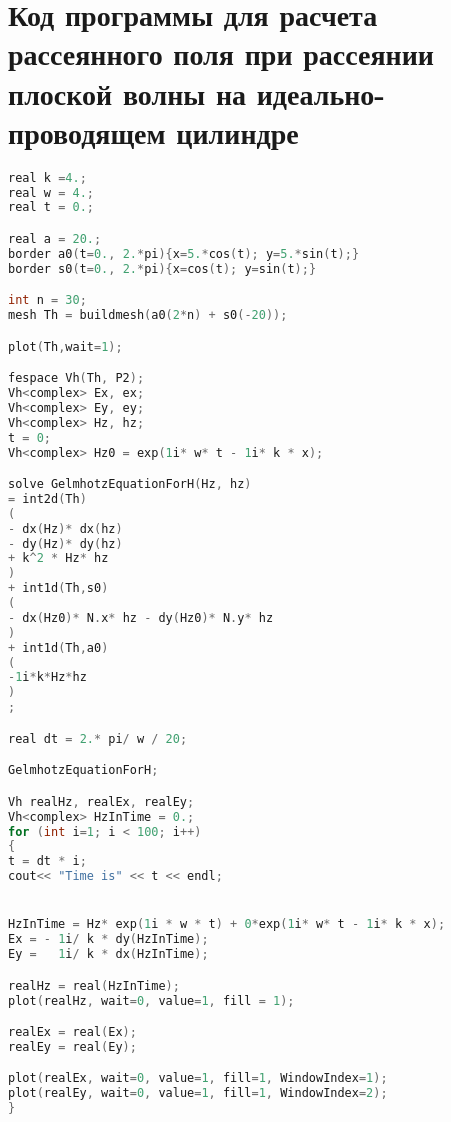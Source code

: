 
\chapter{Код программы для расчета рассеянного поля при рассеянии плоской волны на идеально-проводящем цилиндре}


\begin{lstlisting}[language=C]
real k =4.;
real w = 4.;
real t = 0.;

real a = 20.;
border a0(t=0., 2.*pi){x=5.*cos(t); y=5.*sin(t);}
border s0(t=0., 2.*pi){x=cos(t); y=sin(t);}

int n = 30;
mesh Th = buildmesh(a0(2*n) + s0(-20));

plot(Th,wait=1);

fespace Vh(Th, P2);
Vh<complex> Ex, ex;
Vh<complex> Ey, ey;
Vh<complex> Hz, hz;
t = 0;
Vh<complex> Hz0 = exp(1i* w* t - 1i* k * x);

solve GelmhotzEquationForH(Hz, hz)
= int2d(Th)
(
- dx(Hz)* dx(hz)
- dy(Hz)* dy(hz)
+ k^2 * Hz* hz 
)
+ int1d(Th,s0)
(
- dx(Hz0)* N.x* hz - dy(Hz0)* N.y* hz
)
+ int1d(Th,a0)
(
-1i*k*Hz*hz
)
;

real dt = 2.* pi/ w / 20;

GelmhotzEquationForH;

Vh realHz, realEx, realEy;
Vh<complex> HzInTime = 0.;
for (int i=1; i < 100; i++)
{
t = dt * i;
cout<< "Time is" << t << endl;  


HzInTime = Hz* exp(1i * w * t) + 0*exp(1i* w* t - 1i* k * x);
Ex = - 1i/ k * dy(HzInTime);
Ey =   1i/ k * dx(HzInTime);

realHz = real(HzInTime);
plot(realHz, wait=0, value=1, fill = 1);

realEx = real(Ex);
realEy = real(Ey);

plot(realEx, wait=0, value=1, fill=1, WindowIndex=1);
plot(realEy, wait=0, value=1, fill=1, WindowIndex=2);
}
\end{lstlisting}
